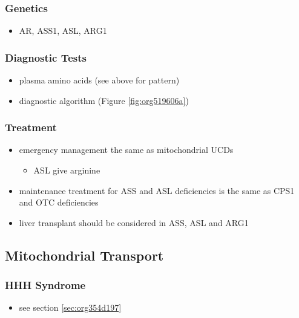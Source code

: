 \documentclass{scrartcl}
\begin{document}
\subsubsection{Genetics}
\label{sec:org53c6e84}
\begin{itemize}
\item AR, ASS1, ASL, ARG1
\end{itemize}

\subsubsection{Diagnostic Tests}
\label{sec:orga981b67}
\begin{itemize}
\item plasma amino acids (see above for pattern)
\item diagnostic algorithm (Figure \ref{fig:org519606a})
\end{itemize}

\subsubsection{Treatment}
\label{sec:org82dfbec}
\begin{itemize}
\item emergency management the same as mitochondrial UCDs
\begin{itemize}
\item ASL give arginine
\end{itemize}
\item maintenance treatment for ASS and ASL deficiencies is the same as
CPS1 and OTC deficiencies
\item liver transplant should be considered in ASS, ASL and ARG1
\end{itemize}

\subsection{Mitochondrial Transport}
\label{sec:org5422125}
\subsubsection{HHH Syndrome}
\label{sec:org388747c}
\begin{itemize}
\item see section \ref{sec:org354d197}
\end{itemize}
\end{document}
